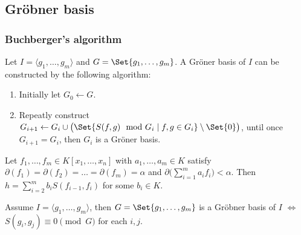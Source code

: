 \subsection{Gr\"{o}bner basis}

\subsubsection{Buchberger's algorithm}

Let $I = \langle g_1, \dots, g_m \rangle$ and $G = \Set{ g_1, \dots, g_m }$.
A Gr\"{o}ner basis of $I$ can be constructed by the following algorithm:
\begin{enumerate}
  \item Initially let $G_0 \gets G$.
  \item Repeatly construct $G_{i+1} \gets G_i \cup \big( \Set{S(f, g) \mod G_i \mid f, g \in G_i} \setminus \Set{0} \big)$,
    until once $G_{i+1} = G_i$, then $G_i$ is a Gr\"{o}ner basis.
\end{enumerate}

\begin{lemma}
  Let $f_1, \dots, f_m \in K[x_1, \dots, x_n]$ with $a_1, \dots, a_m \in K$ satisfy
  $\partial(f_1) = \partial(f_2) = \dots = \partial(f_m) = \alpha$ and $\partial\big( \sum_{i = 1}^m a_i f_i \big) < \alpha$.
  Then $h = \sum_{i = 2}^m b_i S(f_{i-1}, f_i)$ for some $b_i \in K$.
\end{lemma}

\begin{theorem}
  Assume $I = \langle g_1, \dots, g_m \rangle$, then
  $G = \Set{g_1, \dots, g_m}$ is a Gr\"{o}bner basis of $I$ $\iff$ $S(g_i, g_j) \equiv 0 \pmod{G}$ for each $i, j$.
\end{theorem}
